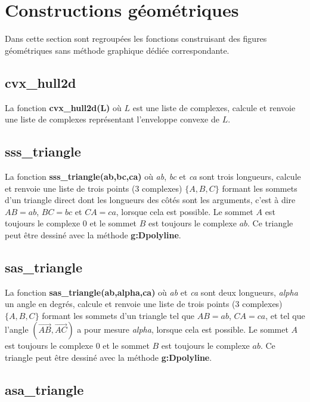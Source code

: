 \section{Constructions géométriques}

Dans cette section sont regroupées les fonctions construisant des figures géométriques sans méthode graphique dédiée correspondante.

\subsection{cvx\_hull2d}

La fonction \textbf{cvx\_hull2d(L)} où $L$ est une liste de complexes, calcule et renvoie une liste de complexes représentant l'enveloppe convexe de $L$.

\subsection{sss\_triangle}

La fonction \textbf{sss\_triangle(ab,bc,ca)} où \emph{ab}, \emph{bc} et \emph{ca} sont trois longueurs, calcule et renvoie une liste de trois points (3 complexes) $\{A,B,C\}$ formant les sommets d'un triangle direct dont les longueurs des côtés sont les arguments, c'est à dire $AB=ab$, $BC=bc$ et $CA=ca$, lorsque cela est possible. Le sommet $A$ est toujours le complexe $0$ et le sommet $B$ est toujours le complexe $ab$. Ce triangle peut être dessiné avec la méthode \textbf{g:Dpolyline}.

\subsection{sas\_triangle}

La fonction \textbf{sas\_triangle(ab,alpha,ca)} où \emph{ab} et \emph{ca} sont deux longueurs, \emph{alpha} un angle en degrés, calcule et renvoie une liste de trois points (3 complexes) $\{A,B,C\}$ formant les sommets d'un triangle tel que $AB=ab$, $CA=ca$, et tel que l'angle $(\vec{AB},\vec{AC})$ a pour mesure \emph{alpha}, lorsque cela est possible. Le sommet $A$ est toujours le complexe $0$ et le sommet $B$ est toujours le complexe $ab$. Ce triangle peut être dessiné avec la méthode \textbf{g:Dpolyline}.

\subsection{asa\_triangle}

